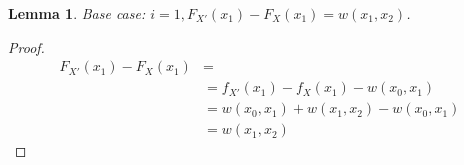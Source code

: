 \documentclass{article}
\newtheorem{lemma}[thm]{Lemma}
\begin{document}

\begin{lemma}
	Base case: $i = 1, F_{X'}(x_{1})-F_{X}(x_{1}) = w(x_{1}, x_{2})$.
\end{lemma}
\begin{proof}
	\begin{align*}
	F_{X'}(x_{1})-F_{X}(x_{1}) &= \\
	& = f_{X'}(x_{1}) - f_{X}(x_{1}) - w(x_0, x_1)  \\
	& = w(x_{0},x_1) + w(x_1,x_{2}) - w(x_0, x_1)  \\
	& = w(x_1,x_{2})
	\end{align*}
\end{proof}
\end{document}

